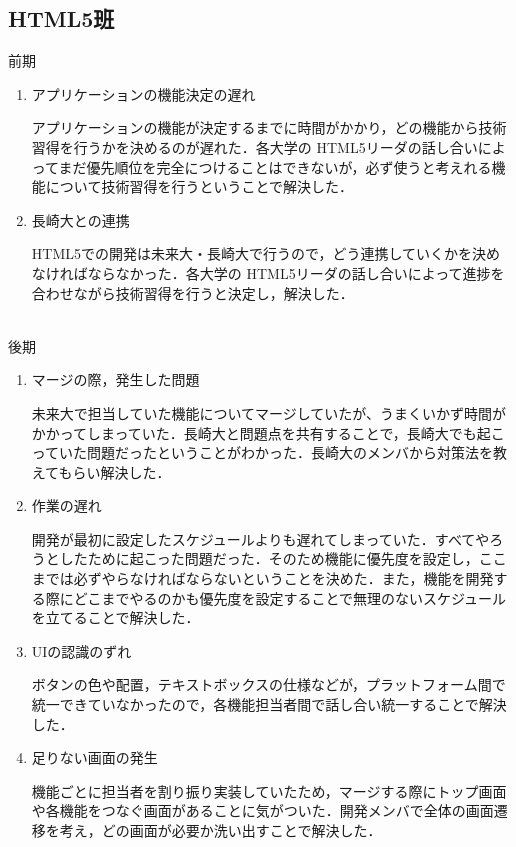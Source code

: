 \subsection{HTML5班}
前期
\\
\begin{enumerate}
\item アプリケーションの機能決定の遅れ
\par
アプリケーションの機能が決定するまでに時間がかかり，どの機能から技術習得を行うかを決めるのが遅れた．各大学の HTML5リーダの話し合いによってまだ優先順位を完全につけることはできないが，必ず使うと考えれる機能について技術習得を行うということで解決した．
\item 長崎大との連携
\par
HTML5での開発は未来大・長崎大で行うので，どう連携していくかを決めなければならなかった．各大学の HTML5リーダの話し合いによって進捗を合わせながら技術習得を行うと決定し，解決した．
\end{enumerate}
\\
後期
\\
\begin{enumerate}
\item マージの際，発生した問題
\par
未来大で担当していた機能についてマージしていたが、うまくいかず時間がかかってしまっていた．長崎大と問題点を共有することで，長崎大でも起こっていた問題だったということがわかった．長崎大のメンバから対策法を教えてもらい解決した．
\item 作業の遅れ
\par
開発が最初に設定したスケジュールよりも遅れてしまっていた．すべてやろうとしたために起こった問題だった．そのため機能に優先度を設定し，ここまでは必ずやらなければならないということを決めた．また，機能を開発する際にどこまでやるのかも優先度を設定することで無理のないスケジュールを立てることで解決した．
\item UIの認識のずれ
\par
ボタンの色や配置，テキストボックスの仕様などが，プラットフォーム間で統一できていなかったので，各機能担当者間で話し合い統一することで解決した．
\item 足りない画面の発生
\par 
機能ごとに担当者を割り振り実装していたため，マージする際にトップ画面や各機能をつなぐ画面があることに気がついた．開発メンバで全体の画面遷移を考え，どの画面が必要か洗い出すことで解決した．
\end{enumerate}
